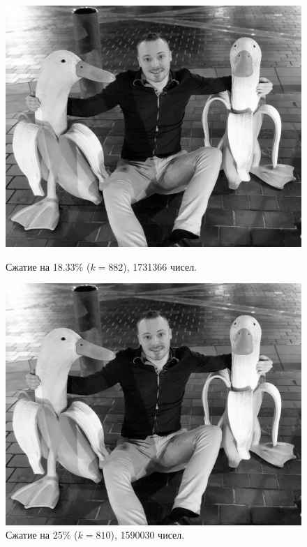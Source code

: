 \documentclass[a3paper,14pt]{extarticle}
\begin{document}
\begin{figure}[H]
    \begin{minipage}{0.45\textwidth}
        \centering\includegraphics[width=\textwidth]{banana ducks_882.jpg}
        \caption{Сжатие на 18.33\% ($k=882$), 1731366 чисел.\\}
    \end{minipage}\hfill
    \begin{minipage}{0.45\textwidth}
        \centering\includegraphics[width=\textwidth]{banana ducks_810.jpg}
        \caption{Сжатие на 25\% ($k=810$), 1590030 чисел.}

\end{minipage}
\end{figure}
\end{document}
